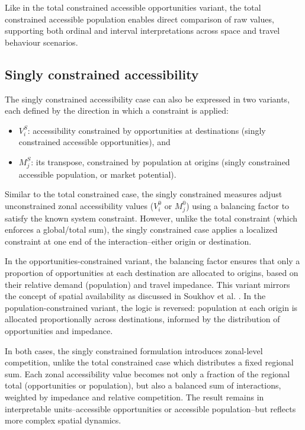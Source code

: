 \documentclass[
  10pt,
  letterpaper,
]{article}
\providecommand{\tightlist}{%
  \setlength{\itemsep}{0pt}\setlength{\parskip}{0pt}}\usepackage{longtable,booktabs,array}
\begin{document}
Like in the total constrained accessible opportunities variant, the
total constrained accessible population enables direct comparison of raw
values, supporting both ordinal and interval interpretations across
space and travel behaviour scenarios.

\subsection{Singly constrained
accessibility}\label{singly-constrained-accessibility}

The singly constrained accessibility case can also be expressed in two
variants, each defined by the direction in which a constraint is
applied:

\begin{itemize}
\tightlist
\item
  \(V_i^S\): accessibility constrained by opportunities at destinations
  (singly constrained accessible opportunities), and
\item
  \(M_j^S\): its transpose, constrained by population at origins (singly
  constrained accessible population, or market potential).
\end{itemize}

Similar to the total constrained case, the singly constrained measures
adjust unconstrained zonal accessibility values (\(V_i^0\) or \(M_j^0\))
using a balancing factor to satisfy the known system constraint.
However, unlike the total constraint (which enforces a global/total
sum), the singly constrained case applies a localized constraint at one
end of the interaction--either origin or destination.

In the opportunities-constrained variant, the balancing factor ensures
that only a proportion of opportunities at each destination are
allocated to origins, based on their relative demand (population) and
travel impedance. This variant mirrors the concept of spatial
availability as discussed in Soukhov et al.
\citep{soukhovIntroducingSpatialAvailability2023}. In the
population-constrained variant, the logic is reversed: population at
each origin is allocated proportionally across destinations, informed by
the distribution of opportunities and impedance.

In both cases, the singly constrained formulation introduces zonal-level
competition, unlike the total constrained case which distributes a fixed
regional sum. Each zonal accessibility value becomes not only a fraction
of the regional total (opportunities or population), but also a balanced
sum of interactions, weighted by impedance and relative competition. The
result remains in interpretable units--accessible opportunities or
accessible population--but reflects more complex spatial dynamics.
\end{document}
